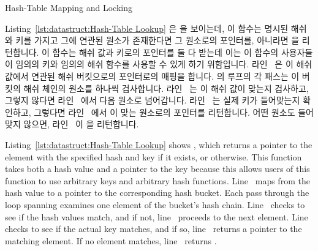 \begin{listing}[tb]

\caption{Hash-Table Mapping and Locking}
\label{lst:datastruct:Hash-Table Mapping and Locking}
\end{listing}

\begin{fcvref}
Listing~\ref{lst:datastruct:Hash-Table Lookup}
은  을 보이는데, 이 함수는 명시된 해쉬와 키를 가지고 그에
연관된 원소가 존재한다면 그 원소로의 포인터를, 아니라면  을
리턴합니다.
이 함수는 해쉬 값과 키로의 포인터를 둘 다 받는데 이는 이 함수의 사용자들이
임의의 키와 임의의 해쉬 함수를 사용할 수 있게 하기 위함입니다.
라인~ 은 이 해쉬 값에서 연관된 해쉬 버킷으로의 포인터로의 매핑을
합니다.
 의 루프의 각 패스는 이 버킷의 해쉬 체인의 원소를
하나씩 검사합니다.
라인~ 는 이 해쉬 값이 맞는지 검사하고, 그렇지 않다면
라인~ 에서 다음 원소로 넘어갑니다.
라인~ 는 실제 키가 들어맞는지 확인하고, 그렇다면
라인~ 에서 이 맞는 원소로의 포인터를 리턴합니다.
어떤 원소도 들어맞지 않으면, 라인~ 이  을 리턴합니다.
\end{fcvref}

\iffalse

\begin{fcvref}
Listing~\ref{lst:datastruct:Hash-Table Lookup}
shows ,
which returns a pointer to the element with the specified hash and key if it
exists, or  otherwise.
This function takes both a hash value and a pointer to the key because
this allows users of this function to use arbitrary keys and
arbitrary hash functions.
Line~ maps from the hash value to a pointer to the corresponding
hash bucket.
Each pass through the loop spanning
 examines one element
of the bucket's hash chain.
Line~ checks to see if the hash values match, and if not,
line~
proceeds to the next element.
Line~ checks to see if the actual key matches, and if so,
line~ returns a pointer to the matching element.
If no element matches, line~ returns .
\end{fcvref}

